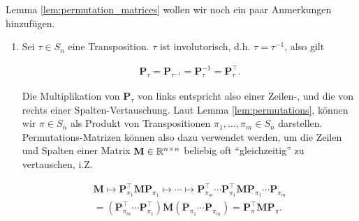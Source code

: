                 \begin{remark} \label{rem:permutation_matrices}

                    Lemma \ref{lem:permutation_matrices} wollen wir noch ein paar Anmerkungen hinzufügen.

                    \begin{enumerate}[
                        label = \arabic*.,
                        wide,
                        labelindent = 0pt
                    ]

                        \item Sei $\tau \in S_n$ eine Transposition.
                        $\tau$ ist involutorisch, d.h. $\tau = \tau^{-1}$, also gilt

                        \begin{align*}
                            \mathbf P_\tau
                            =
                            \mathbf P_{\tau^{-1}}
                            =
                            \mathbf P_\tau^{-1}
                            =
                            \mathbf P_\tau^\top.
                        \end{align*}

                        Die Multiplikation von $\mathbf P_\tau$ von links entspricht also einer Zeilen-, und die von rechts einer Spalten-Vertauschung.
                        Laut Lemma \ref{lem:permutations}, können wir $\pi \in S_n$ als Produkt von Transpositionen $\pi_1, \dots, \pi_m \in S_n$ darstellen.
                        Permutations-Matrizen können also dazu verwendet werden, um die Zeilen und Spalten einer Matrix $\mathbf M \in \mathbb R^{n \times n}$ beliebig oft \enquote{gleichzeitig} zu vertauschen, i.Z.

                        \begin{multline*}
                            \mathbf M
                            \mapsto
                            \mathbf P_{\pi_1}^\top \mathbf M \mathbf P_{\pi_1}
                            \mapsto
                            \cdots
                            \mapsto
                            \mathbf P_{\pi_m}^\top \cdots \mathbf P_{\pi_1}^\top \mathbf M \mathbf P_{\pi_1} \cdots \mathbf P_{\pi_m} \\
                            =
                            (\mathbf P_{\pi_m}^\top \cdots \mathbf P_{\pi_1}^\top) \mathbf M (\mathbf P_{\pi_1} \cdots \mathbf P_{\pi_m})
                            =
                            \mathbf P_\pi^\top \mathbf M \mathbf P_\pi.
                        \end{multline*}


\end{enumerate}
\end{remark}
